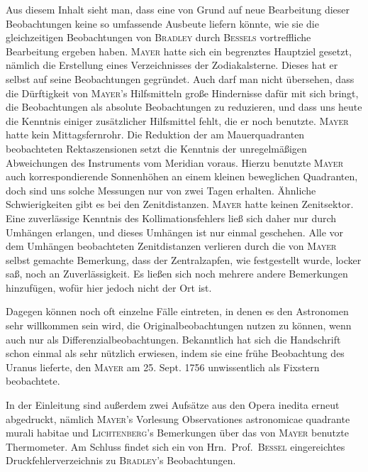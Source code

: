 Aus diesem Inhalt sieht man, dass eine von Grund auf neue Bearbeitung dieser Beobachtungen keine so umfassende Ausbeute liefern könnte, wie sie die gleichzeitigen Beobachtungen von \textsc{Bradley} durch \textsc{Bessels} vortreffliche Bearbeitung ergeben haben. \textsc{Mayer} hatte sich ein begrenztes Hauptziel gesetzt, nämlich die Erstellung eines Verzeichnisses der Zodiakalsterne. Dieses hat er selbst auf seine Beobachtungen gegründet. Auch darf man nicht übersehen, dass die Dürftigkeit von \textsc{Mayer}'s Hilfsmitteln große Hindernisse dafür mit sich bringt, die Beobachtungen als absolute Beobachtungen zu reduzieren, und dass uns heute die Kenntnis einiger zusätzlicher Hilfsmittel fehlt, die er noch benutzte. \textsc{Mayer} hatte kein Mittagsfernrohr. Die Reduktion der am Mauerquadranten beobachteten Rektaszensionen setzt die Kenntnis der unregelmäßigen Abweichungen des Instruments vom Meridian voraus. Hierzu benutzte \textsc{Mayer} auch korrespondierende Sonnenhöhen an einem kleinen beweglichen Quadranten, doch sind uns solche Messungen nur von zwei Tagen erhalten. Ähnliche Schwierigkeiten gibt es bei den Zenitdistanzen. \textsc{Mayer} hatte keinen Zenitsektor. Eine zuverlässige Kenntnis des Kollimationsfehlers ließ sich daher nur durch Umhängen erlangen, und dieses Umhängen ist nur einmal geschehen. Alle vor dem Umhängen beobachteten Zenitdistanzen verlieren durch die von \textsc{Mayer} selbst gemachte Bemerkung, dass der Zentralzapfen, wie festgestellt wurde, locker saß, noch an Zuverlässigkeit. Es ließen sich noch mehrere andere Bemerkungen hinzufügen, wofür hier jedoch nicht der Ort ist.

Dagegen können noch oft einzelne Fälle eintreten, in denen es den Astronomen sehr willkommen sein wird, die Originalbeobachtungen nutzen zu können, wenn auch nur als Differenzialbeobachtungen. Bekanntlich hat sich die Handschrift schon einmal als sehr nützlich erwiesen, indem sie eine frühe Beobachtung des Uranus lieferte, den \textsc{Mayer} am 25. Sept. 1756 unwissentlich als Fixstern beobachtete.

In der Einleitung sind außerdem zwei Aufsätze aus den Opera inedita erneut abgedruckt, nämlich \textsc{Mayer}'s Vorlesung Observationes astronomicae quadrante murali habitae und \textsc{Lichtenberg}'s Bemerkungen über das von \textsc{Mayer} benutzte Thermometer. Am Schluss findet sich ein von Hrn.\ Prof.\ \textsc{Bessel} eingereichtes Druckfehlerverzeichnis zu \textsc{Bradley}'s Beobachtungen.
